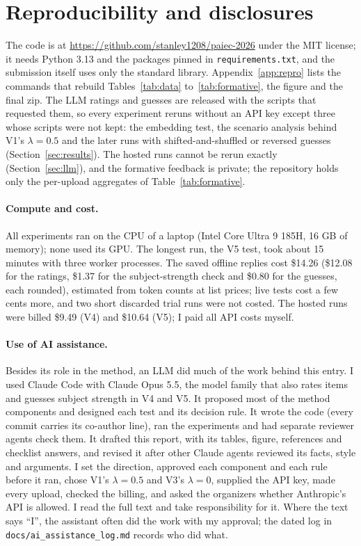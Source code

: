 \section{Reproducibility and disclosures}\label{sec:repro}

The code is at \url{https://github.com/stanley1208/paiec-2026} under the MIT license; it needs Python 3.13 and the packages pinned in \texttt{requirements.txt}, and the submission itself uses only the standard library. Appendix~\ref{app:repro} lists the commands that rebuild Tables~\ref{tab:data} to~\ref{tab:formative}, the figure and the final zip. The LLM ratings and guesses are released with the scripts that requested them, so every experiment reruns without an API key except three whose scripts were not kept: the embedding test, the scenario analysis behind V1's $\lambda = 0.5$ and the later runs with shifted-and-shuffled or reversed guesses (Section~\ref{sec:results}). The hosted runs cannot be rerun exactly (Section~\ref{sec:llm}), and the formative feedback is private; the repository holds only the per-upload aggregates of Table~\ref{tab:formative}.

\paragraph{Compute and cost.}
All experiments ran on the CPU of a laptop (Intel Core Ultra 9 185H, 16 GB of memory); none used its GPU. The longest run, the V5 test, took about 15 minutes with three worker processes. The saved offline replies cost \$14.26 (\$12.08 for the ratings, \$1.37 for the subject-strength check and \$0.80 for the guesses, each rounded), estimated from token counts at list prices; live tests cost a few cents more, and two short discarded trial runs were not costed. The hosted runs were billed \$9.49 (V4) and \$10.64 (V5); I paid all API costs myself.

\paragraph{Use of AI assistance.}
Besides its role in the method, an LLM did much of the work behind this entry. I used Claude Code with Claude Opus 5.5, the model family that also rates items and guesses subject strength in V4 and V5. It proposed most of the method components and designed each test and its decision rule. It wrote the code (every commit carries its co-author line), ran the experiments and had separate reviewer agents check them. It drafted this report, with its tables, figure, references and checklist answers, and revised it after other Claude agents reviewed its facts, style and arguments. I set the direction, approved each component and each rule before it ran, chose V1's $\lambda = 0.5$ and V3's $\lambda = 0$, supplied the API key, made every upload, checked the billing, and asked the organizers whether Anthropic's API is allowed. I read the full text and take responsibility for it. Where the text says ``I'', the assistant often did the work with my approval; the dated log in \texttt{docs/ai\_assistance\_log.md} records who did what.
